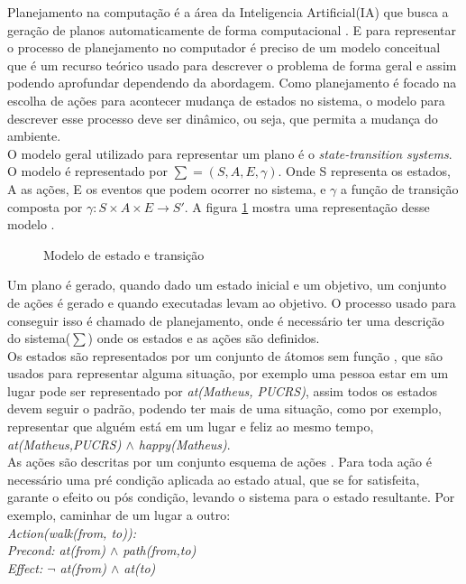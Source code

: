 Planejamento na computação é a área da Inteligencia Artificial(IA) que busca a geração de planos automaticamente de forma computacional \cite{ghallab2004automated}. E para representar o processo de planejamento no computador é preciso de um modelo conceitual que é um recurso teórico usado para descrever o problema de forma geral e assim podendo aprofundar dependendo da abordagem. Como planejamento é  focado na escolha de ações para acontecer mudança de estados no sistema, o modelo para descrever esse processo deve ser dinâmico, ou seja, que permita a mudança do ambiente\cite{ghallab2004automated}. \\

O modelo geral utilizado para representar um plano é o \textit{state-transition systems}. O modelo é representado por $\sum = (S, A, E, \gamma) $. Onde S representa os estados, A as ações, E os eventos que podem ocorrer no sistema, e $\gamma$ a função de transição composta por $ \gamma: S \times A \times E \rightarrow S'$. A figura \ref{fig:planmodelo} mostra uma representação desse modelo \cite{ghallab2004automated}.


\begin{figure}[ht]
	\centering
	\caption{Modelo de estado e transição}
	\label{fig:planmodelo}
\end{figure} 

Um plano é gerado, quando dado um estado inicial e um objetivo, um conjunto de ações é gerado e quando executadas levam ao objetivo. O processo usado para conseguir isso é chamado de planejamento, onde é necessário ter uma descrição do sistema($\sum$) onde os estados e as ações são definidos.\\ 
Os estados são representados por um conjunto de átomos sem função \cite{intelligence2003modern}, que são usados para representar alguma situação, por exemplo uma pessoa estar em um lugar pode ser representado por \textit{at(Matheus, PUCRS)}, assim todos os estados devem seguir o padrão, podendo ter mais de uma situação, como por exemplo, representar que alguém está em um lugar e feliz ao mesmo tempo, \textit{at(Matheus,PUCRS) $\wedge$ happy(Matheus)}. \\
As ações são descritas por um conjunto esquema de ações \cite{intelligence2003modern}. Para toda ação é necessário uma pré condição aplicada ao estado atual, que se for satisfeita, garante o efeito ou pós condição, levando o sistema para o estado resultante. Por exemplo, caminhar de um lugar a outro: \\
\textit{Action(walk(from, to)): \\
Precond: at(from)  $\wedge$ path(from,to) \\
Effect: $\neg$ at(from)  $\wedge$ at(to)}

